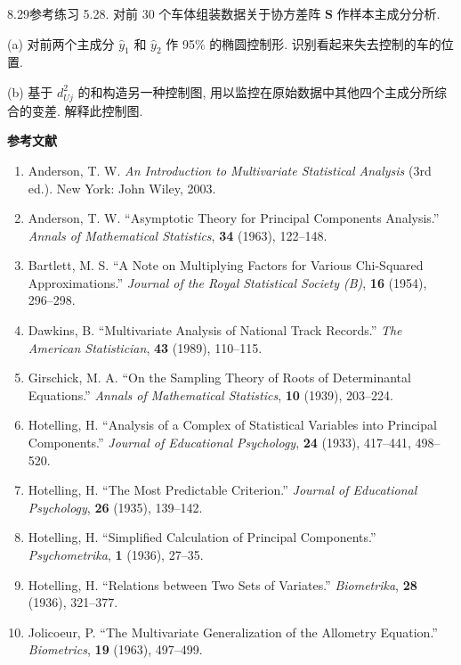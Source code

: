 
8.29\quad 参考练习 5.28. 对前 30 个车体组装数据关于协方差阵 $\mathbf{S}$ 作样本主成分分析.

(a) 对前两个主成分 $\hat{y}_1$ 和 $\hat{y}_2$ 作 95\% 的椭圆控制形. 识别看起来失去控制的车的位置.

(b) 基于 $d_{Uj}^2$ 的和构造另一种控制图, 用以监控在原始数据中其他四个主成分所综合的变差. 解释此控制图.

\vspace{0.5em}
\begin{center}
\label{bib:8}
{\large\bfseries 参考文献}
\end{center}

\begin{enumerate}[label=\arabic*.,leftmargin=2em,itemsep=4pt]
\item Anderson, T. W. \textit{An Introduction to Multivariate Statistical Analysis} (3rd ed.). New York: John Wiley, 2003.
\item Anderson, T. W. ``Asymptotic Theory for Principal Components Analysis.'' \textit{Annals of Mathematical Statistics}, \textbf{34} (1963), 122--148.
\item Bartlett, M. S. ``A Note on Multiplying Factors for Various Chi-Squared Approximations.'' \textit{Journal of the Royal Statistical Society (B)}, \textbf{16} (1954), 296--298.
\item Dawkins, B. ``Multivariate Analysis of National Track Records.'' \textit{The American Statistician}, \textbf{43} (1989), 110--115.
\item Girschick, M. A. ``On the Sampling Theory of Roots of Determinantal Equations.'' \textit{Annals of Mathematical Statistics}, \textbf{10} (1939), 203--224.
\item Hotelling, H. ``Analysis of a Complex of Statistical Variables into Principal Components.'' \textit{Journal of Educational Psychology}, \textbf{24} (1933), 417--441, 498--520.
\item Hotelling, H. ``The Most Predictable Criterion.'' \textit{Journal of Educational Psychology}, \textbf{26} (1935), 139--142.
\item Hotelling, H. ``Simplified Calculation of Principal Components.'' \textit{Psychometrika}, \textbf{1} (1936), 27--35.
\item Hotelling, H. ``Relations between Two Sets of Variates.'' \textit{Biometrika}, \textbf{28} (1936), 321--377.
\item Jolicoeur, P. ``The Multivariate Generalization of the Allometry Equation.'' \textit{Biometrics}, \textbf{19} (1963), 497--499.

\end{enumerate}
